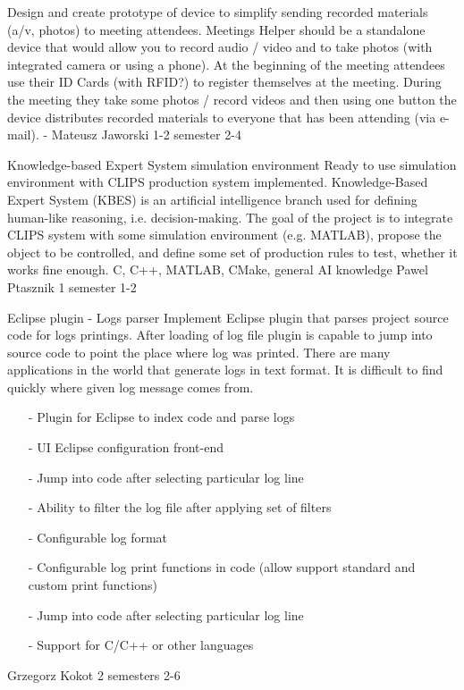 \begin{project}
{}
{Design and create prototype of device to simplify sending recorded materials
(a/v, photos) to meeting attendees.} {
Meetings Helper should be a standalone device that would allow you to record audio / video 
and to take photos (with integrated camera or using a phone). At the beginning of the meeting 
attendees use their ID Cards (with RFID?) to register themselves at the meeting. 
During the meeting they take some photos / record videos and then using one button 
the device distributes recorded materials to everyone that has been attending (via e-mail). }
{-}
{Mateusz Jaworski}
{1-2 semester}
{2-4}
\end{project}
\begin{project}
{Knowledge-based Expert System simulation environment}
{Ready to use simulation environment with CLIPS production system implemented.}
{
Knowledge-Based Expert System (KBES) is an artificial intelligence branch used for defining human-like reasoning, i.e. decision-making. The goal of the project is to integrate CLIPS system with some simulation environment (e.g. MATLAB), propose the object to be controlled, and define some set of production rules to test, whether it works fine enough. }
{C, C++, MATLAB, CMake, general AI knowledge}
{Pawel Ptasznik}
{1 semester}
{1-2}
\end{project}
\begin{project}
{Eclipse plugin - Logs parser}
{
Implement Eclipse plugin that parses project source code for logs printings.
After loading of log file plugin is capable to jump into source code to point
the place where log was printed.
There are many applications in the world that generate logs in text format. It is difficult to find quickly where given log message comes from. 
}
{
 \begin{itemize}
  \item[-] Plugin for Eclipse to index code and parse logs
  \item[-] UI Eclipse configuration front-end
  \item[-] Jump into code after selecting particular log line
  \item[-] Ability to filter the log file after applying set of filters
\end{itemize}
}
{
 \begin{itemize}
  \item[-] Configurable log format
  \item[-] Configurable log print functions in code (allow support standard and custom print functions)
  \item[-] Jump into code after selecting particular log line
  \item[-] Support for C/C++ or other languages
\end{itemize}
}
{Grzegorz Kokot}
{2 semesters}
{2-6}
\end{project}
